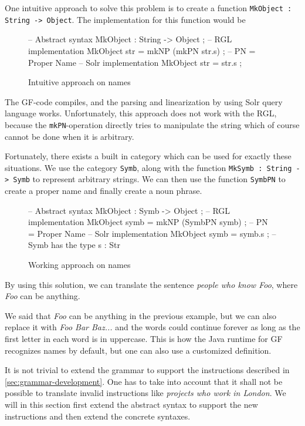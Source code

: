 One intuitive approach to solve this problem is to create a function \texttt{MkObject : String -> Object}. The implementation for this function would be 
\begin{figure}[H]
\begin{code}
-- Abstract syntax
MkObject : String -> Object ;
-- RGL implementation
MkObject str = mkNP (mkPN str.s) ; -- PN = Proper Name
-- Solr implementation
MkObject str = str.s ;
\end{code}
\caption{Intuitive approach on names}
\end{figure}

The GF-code compiles, and the parsing and linearization by using Solr query language works. Unfortunately, this approach does not work with the RGL, because the \texttt{mkPN}-operation directly tries to manipulate the string which of course cannot be done when it is arbitrary.

Fortunately, there exists a built in category which can be used for exactly these situations. We use the category \texttt{Symb}, along with the function \texttt{MkSymb : String -> Symb} to represent arbitrary strings. We can then use the function \texttt{SymbPN} to create a proper name and finally create a noun phrase.
\begin{figure}[H]
\begin{code}
-- Abstract syntax
MkObject : Symb -> Object ;
-- RGL implementation
MkObject symb = mkNP (SymbPN symb) ; -- PN = Proper Name
-- Solr implementation
MkObject symb = symb.s ; -- Symb has the type { s : Str }
\end{code}
\caption{Working approach on names}
\end{figure}

By using this solution, we can translate the sentence \emph{people who know Foo}, where \emph{Foo} can be anything.

We said that \emph{Foo} can be anything in the previous example, but we can also replace it with \emph{Foo Bar Baz...} and the words could continue forever as long as the first letter in each word is in uppercase. This is how the Java runtime for GF recognizes names by default, but one can also use a customized definition.

It is not trivial to extend the grammar to support the instructions described in \autoref{sec:grammar-development}. One has to take into account that it shall not be possible to translate invalid instructions like \emph{projects who work in London}. We will in this section first extend the abstract syntax to support the new instructions and then extend the concrete syntaxes.

